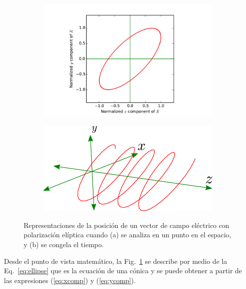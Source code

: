 \begin{figure}[h!]
\centering
\begin{subfigure}{.45\textwidth}
  \centering
  \includegraphics[width=1\linewidth]{ellipse_clean}
  \caption{}
\label{fig:ellipse_clean}
\end{subfigure}\qquad
\begin{subfigure}{.45\textwidth}
  \centering
  \includegraphics[width=.8\linewidth]{trayectory_clean}
  \caption{}
  \label{fig:trayectory_clean}
\end{subfigure}
\caption[Distintas representaciones del campo eléctrico para ilustrar
la polarización]{Representaciones de la posición de un vector de campo
  eléctrico con polarización elíptica cuando (a) se analiza en un
  punto en el espacio, y (b) se  congela el tiempo.} 
\label{fig:general_field}
\end{figure} 

Desde el punto de vista matemático, la Fig.~\ref{fig:ellipse_clean} se describe por medio de la Eq.~\ref{eq:ellipse} que es la ecuación de una cónica y se puede obtener
a partir de las expresiones (\ref{eq:xcomp}) y (\ref{eq:ycomp}). 


